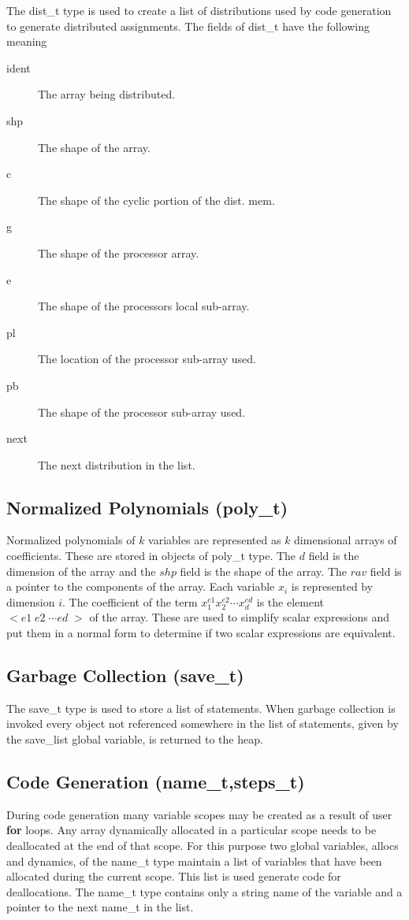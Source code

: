 The dist\_t type is used to create a list of distributions used by code 
generation to generate distributed assignments.  The fields of dist\_t
have the following meaning
\begin{description}
\item[ident] The array being distributed.
\item[shp] The shape of the array.
\item[c] The shape of the cyclic portion of the dist. mem.
\item[g] The shape of the processor array.
\item[e] The shape of the processors local sub-array.
\item[pl] The location of the processor sub-array used.
\item[pb] The shape of the processor sub-array used.
\item[next] The next distribution in the list.
\end{description}

\subsection{Normalized Polynomials (poly\_t)}
Normalized polynomials of $k$ variables are represented as
$k$ dimensional arrays of coefficients.  These are stored in objects of
poly\_t type.  The $d$ field is the dimension of the array and the $shp$
field is the shape of the array.  The $rav$ field is a pointer to the
components of the array.  Each variable $x_{i}$ is represented by dimension
$i$.  The coefficient of the term $x_{1}^{e1}x_{2}^{e2}\cdots x_{d}^{ed}$
is the element $<e1\; e2\; \cdots ed\; >$ of the array.  These are used
to simplify scalar expressions and put them in a normal form to determine
if two scalar expressions are equivalent.

\subsection{Garbage Collection (save\_t)}
The save\_t type is used to store a list of statements.  When garbage 
collection is invoked every object not referenced somewhere in the list
of statements, given by the save\_list global variable, is returned to the
heap.

\subsection{Code Generation (name\_t,steps\_t)}
During code generation many variable scopes may be created as a result of 
user {\bf for} loops.  Any array dynamically allocated in a particular
scope needs to be deallocated at the end of that scope.  For this purpose two
global variables, allocs and dynamics, of the name\_t type maintain a list of
variables that have been allocated during the current scope.  This list is
used generate code for deallocations.  The name\_t type contains only a
string name of the variable and a pointer to the next name\_t in the list.

